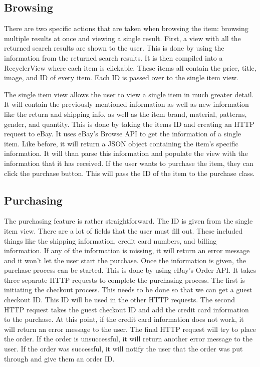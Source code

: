\documentclass[journal,compsoc, 10pt, draftclsnofoot, onecolumn]{IEEEtran}
\begin{document}
\subsection{Browsing}
There are two specific actions that are taken when browsing the item: browsing multiple results
at once and viewing a single result. First, a view with all the returned search results are
shown to the user. This is done by using the information from the returned search results. It
is then compiled into a RecyclerView where each item is clickable. These items all contain the
price, title, image, and ID of every item. Each ID is passed over to the single item view.
\newline

The single item view allows the user to view a single item in much greater detail. It will
contain the previously mentioned information as well as new information like the return and
shipping info, as well as the item brand, material, patterns, gender, and quantity. This is
done by taking the items ID and creating an HTTP request to eBay. It uses eBay's Browse API to
get the information of a single item. Like before, it will return a JSON object containing the
item's specific information. It will than parse this information and populate the view with the
information that it has received. If the user wants to purchase the item, they can click the
purchase button. This will pass the ID of the item to the purchase class.

\subsection{Purchasing}
The purchasing feature is rather straightforward. The ID is given from the single item view.
There are a lot of fields that the user must fill out. These included things like the shipping
information, credit card numbers, and billing information. If any of the information is
missing, it will return an error message and it won't let the user start the purchase. Once the
information is given, the purchase process can be started. This is done by using eBay's Order
API. It takes three separate HTTP requests to complete the purchasing process. The first is
initiating the checkout process. This needs to be done so that we can get a guest checkout ID.
This ID will be used in the other HTTP requests. The second HTTP request takes the guest
checkout ID and add the credit card information to the purchase. At this point, if the credit
card information does not work, it will return an error message to the user. The final HTTP
request will try to place the order. If the order is unsuccessful, it will return another error
message to the user. If the order was successful, it will notify the user that the order was
put through and give them an order ID.
\end{document}

